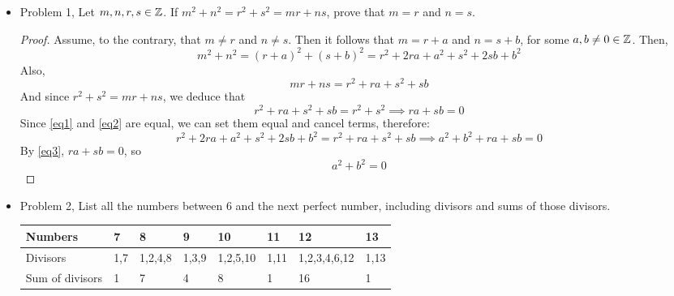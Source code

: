 \documentclass[hidelinks,12pt]{article}
\begin{document}
\begin{itemize}
    \item Problem 1, Let $m,n,r,s\in\mathbb{Z}$. If $m^2+n^2=r^2+s^2=mr+ns$, prove that $m=r$ and $n=s$.
    \begin{proof}
    Assume, to the contrary, that $m\neq r$ and $n\neq s$. Then it follows that $m=r+a$ and $n=s+b$, for some $a,b\neq0\in\mathbb{Z}$. Then,\begin{equation}\label{eq1}
        m^2+n^2=(r+a)^2+(s+b)^2=r^2+2ra+a^2+s^2+2sb+b^2
    \end{equation}Also,\begin{equation}\label{eq2}
        mr+ns=r^2+ra+s^2+sb
    \end{equation}And since $r^2+s^2=mr+ns$, we deduce that\begin{equation}\label{eq3}
        r^2+ra+s^2+sb=r^2+s^2\implies ra+sb=0
    \end{equation}
    Since \ref{eq1} and \ref{eq2} are equal, we can set them equal and cancel terms, therefore:\begin{equation}\label{eq4}
        r^2+2ra+a^2+s^2+2sb+b^2=r^2+ra+s^2+sb\implies a^2+b^2+ra+sb=0
    \end{equation}
    By \ref{eq3}, $ra+sb=0$, so $$a^2+b^2=0$$\scalebox{1.5}{\Lightning}
    \end{proof}
    \item Problem 2, List all the numbers between 6 and the next perfect number, including divisors and sums of those divisors.
\begin{table}[h]
\begin{tabular}{|l|l|l|l|l|l|l|l|}
\hline
\rowcolor[HTML]{CBCEFB} 
Numbers                           & 7                            & 8                                         & 9                              & 10                                & 11                               & 12                                    & 13       \\ \hline
\rowcolor[HTML]{9AFF99} 
Divisors                          & 1,7                          & 1,2,4,8                                   & 1,3,9                          & 1,2,5,10                          & 1,11                             & 1,2,3,4,6,12                          & 1,13     \\ \hline
\rowcolor[HTML]{FFCE93} 
Sum of divisors                   & 1                            & 7                                         & 4                              & 8                                 & 1                                & 16                                    & 1        \\ \hline

\end{tabular}
\end{table}
\end{itemize}
\end{document}
